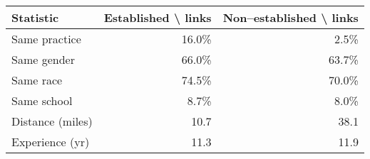 \begin{table}[!h]
\centering
\begin{tabular}{lrr}
\toprule
Statistic & Established \textbackslash{} links & Non--established \textbackslash{} links\\
\midrule
Same practice & 16.0\% & 2.5\%\\
Same gender & 66.0\% & 63.7\%\\
Same race & 74.5\% & 70.0\%\\
Same school & 8.7\% & 8.0\%\\
Distance (miles) & 10.7 & 38.1\\
\addlinespace
Experience (yr) & 11.3 & 11.9\\
\bottomrule
\end{tabular}
\end{table}

